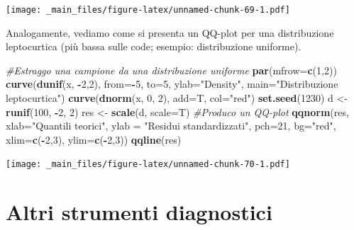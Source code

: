 \documentclass[a4paper,12pt,oneside]{book}
\newenvironment{Shaded}{\begin{snugshade}}{\end{snugshade}}
\newcommand{\KeywordTok}[1]{\textcolor[rgb]{0.13,0.29,0.53}{\textbf{#1}}}
\newcommand{\DataTypeTok}[1]{\textcolor[rgb]{0.13,0.29,0.53}{#1}}
\newcommand{\DecValTok}[1]{\textcolor[rgb]{0.00,0.00,0.81}{#1}}
\newcommand{\StringTok}[1]{\textcolor[rgb]{0.31,0.60,0.02}{#1}}
\newcommand{\CommentTok}[1]{\textcolor[rgb]{0.56,0.35,0.01}{\textit{#1}}}
\newcommand{\OperatorTok}[1]{\textcolor[rgb]{0.81,0.36,0.00}{\textbf{#1}}}
\newcommand{\NormalTok}[1]{#1}
\theoremstyle{definition}
\theoremstyle{definition}
\theoremstyle{definition}
\theoremstyle{remark}
\begin{document}
\texttt{[image: \_main\_files/figure-latex/unnamed-chunk-69-1.pdf]}

Analogamente, vediamo come si presenta un QQ-plot per una distribuzione
leptocurtica (più bassa sulle code; esempio: distribuzione uniforme).

\begin{Shaded}
\begin{Highlighting}[]
\CommentTok{#Estraggo una campione da una distribuzione uniforme}
\KeywordTok{par}\NormalTok{(}\DataTypeTok{mfrow=}\KeywordTok{c}\NormalTok{(}\DecValTok{1}\NormalTok{,}\DecValTok{2}\NormalTok{))}
\KeywordTok{curve}\NormalTok{(}\KeywordTok{dunif}\NormalTok{(x, }\OperatorTok{-}\DecValTok{2}\NormalTok{,}\DecValTok{2}\NormalTok{), }\DataTypeTok{from=}\OperatorTok{-}\DecValTok{5}\NormalTok{, }\DataTypeTok{to=}\DecValTok{5}\NormalTok{, }\DataTypeTok{ylab=}\StringTok{"Density"}\NormalTok{, }\DataTypeTok{main=}\StringTok{"Distribuzione leptocurtica"}\NormalTok{)}
\KeywordTok{curve}\NormalTok{(}\KeywordTok{dnorm}\NormalTok{(x, }\DecValTok{0}\NormalTok{, }\DecValTok{2}\NormalTok{), }\DataTypeTok{add=}\NormalTok{T, }\DataTypeTok{col=}\StringTok{"red"}\NormalTok{)}
\KeywordTok{set.seed}\NormalTok{(}\DecValTok{1230}\NormalTok{)}
\NormalTok{d <-}\StringTok{ }\KeywordTok{runif}\NormalTok{(}\DecValTok{100}\NormalTok{, }\OperatorTok{-}\DecValTok{2}\NormalTok{, }\DecValTok{2}\NormalTok{)}
\NormalTok{res <-}\StringTok{ }\KeywordTok{scale}\NormalTok{(d, }\DataTypeTok{scale=}\NormalTok{T)}
\CommentTok{#Produco un QQ-plot}
\KeywordTok{qqnorm}\NormalTok{(res, }\DataTypeTok{xlab=}\StringTok{"Quantili teorici"}\NormalTok{, }
     \DataTypeTok{ylab =} \StringTok{"Residui  standardizzati"}\NormalTok{, }
     \DataTypeTok{pch=}\DecValTok{21}\NormalTok{, }\DataTypeTok{bg=}\StringTok{"red"}\NormalTok{, }\DataTypeTok{xlim=}\KeywordTok{c}\NormalTok{(}\OperatorTok{-}\DecValTok{2}\NormalTok{,}\DecValTok{3}\NormalTok{), }\DataTypeTok{ylim=}\KeywordTok{c}\NormalTok{(}\OperatorTok{-}\DecValTok{2}\NormalTok{,}\DecValTok{3}\NormalTok{))}
\KeywordTok{qqline}\NormalTok{(res)}
\end{Highlighting}
\end{Shaded}

\texttt{[image: \_main\_files/figure-latex/unnamed-chunk-70-1.pdf]}

\section{Altri strumenti diagnostici}\label{altri-strumenti-diagnostici}
\end{document}
